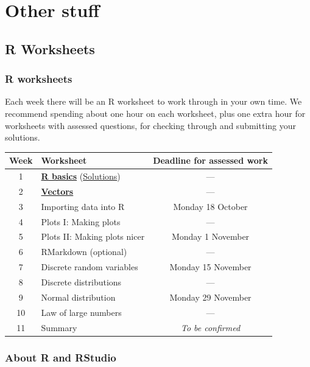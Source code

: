\documentclass[
  a4paper,
]{book}
\theoremstyle{definition}
\theoremstyle{definition}
\theoremstyle{definition}
\theoremstyle{definition}
\theoremstyle{remark}
\begin{document}
\hypertarget{part-other-stuff}{%
\part*{Other stuff}\label{part-other-stuff}}

\hypertarget{R}{%
\chapter*{R Worksheets}\label{R}}

\hypertarget{r-work}{%
\section*{R worksheets}\label{r-work}}

Each week there will be an R worksheet to work through in your own time. We recommend spending about one hour on each worksheet, plus one extra hour for worksheets with assessed questions, for checking through and submitting your solutions.

\begin{longtable}[]{@{}clc@{}}
\toprule
Week & Worksheet & Deadline for assessed work \\
\midrule
\endhead
1 & \href{https://mpaldridge.github.io/math1710/R1.html}{\textbf{R basics}} (\href{https://mpaldridge.github.io/math1710/R1-solutions.html}{Solutions}) & --- \\
2 & \href{https://mpaldridge.github.io/math1710/R2.html}{\textbf{Vectors}} & --- \\
3 & Importing data into R & Monday 18 October \\
4 & Plots I: Making plots & --- \\
5 & Plots II: Making plots nicer & Monday 1 November \\
6 & RMarkdown (optional) & --- \\
7 & Discrete random variables & Monday 15 November \\
8 & Discrete distributions & --- \\
9 & Normal distribution & Monday 29 November \\
10 & Law of large numbers & --- \\
11 & Summary & \emph{To be confirmed} \\
\bottomrule
\end{longtable}

\hypertarget{about-r}{%
\section*{About R and RStudio}\label{about-r}}
\end{document}
